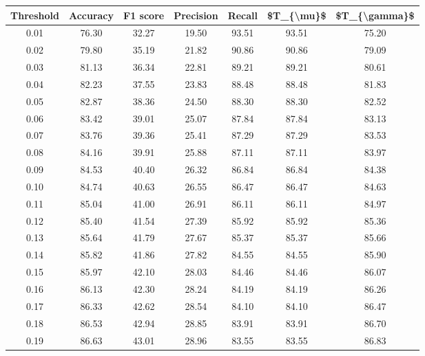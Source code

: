 \begin{tabular}{|c|c|c|c|c|c|c|}
\hline
 Threshold &  Accuracy &  F1 score &  Precision &  Recall &  \$T\_\{\textbackslash mu\}\$ &  \$T\_\{\textbackslash gamma\}\$ \\
\hline
      0.01 &     76.30 &     32.27 &      19.50 &   93.51 &      93.51 &         75.20 \\
      0.02 &     79.80 &     35.19 &      21.82 &   90.86 &      90.86 &         79.09 \\
      0.03 &     81.13 &     36.34 &      22.81 &   89.21 &      89.21 &         80.61 \\
      0.04 &     82.23 &     37.55 &      23.83 &   88.48 &      88.48 &         81.83 \\
      0.05 &     82.87 &     38.36 &      24.50 &   88.30 &      88.30 &         82.52 \\
      0.06 &     83.42 &     39.01 &      25.07 &   87.84 &      87.84 &         83.13 \\
      0.07 &     83.76 &     39.36 &      25.41 &   87.29 &      87.29 &         83.53 \\
      0.08 &     84.16 &     39.91 &      25.88 &   87.11 &      87.11 &         83.97 \\
      0.09 &     84.53 &     40.40 &      26.32 &   86.84 &      86.84 &         84.38 \\
      0.10 &     84.74 &     40.63 &      26.55 &   86.47 &      86.47 &         84.63 \\
      0.11 &     85.04 &     41.00 &      26.91 &   86.11 &      86.11 &         84.97 \\
      0.12 &     85.40 &     41.54 &      27.39 &   85.92 &      85.92 &         85.36 \\
      0.13 &     85.64 &     41.79 &      27.67 &   85.37 &      85.37 &         85.66 \\
      0.14 &     85.82 &     41.86 &      27.82 &   84.55 &      84.55 &         85.90 \\
      0.15 &     85.97 &     42.10 &      28.03 &   84.46 &      84.46 &         86.07 \\
      0.16 &     86.13 &     42.30 &      28.24 &   84.19 &      84.19 &         86.26 \\
      0.17 &     86.33 &     42.62 &      28.54 &   84.10 &      84.10 &         86.47 \\
      0.18 &     86.53 &     42.94 &      28.85 &   83.91 &      83.91 &         86.70 \\
      0.19 &     86.63 &     43.01 &      28.96 &   83.55 &      83.55 &         86.83 \\

\end{tabular}
